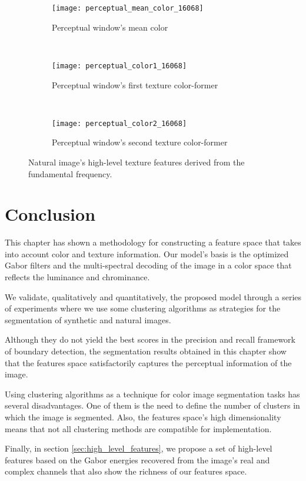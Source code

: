 \begin{figure}[!ht]
    \centering
    \begin{subfigure}[b]{0.7\textwidth}
    	\texttt{[image: perceptual\_mean\_color\_16068]}
        \caption{Perceptual window's mean color}
        \label{fig:perceptual_mean_color_16068}
    \end{subfigure}\\
    \begin{subfigure}[b]{0.7\textwidth}
    	\texttt{[image: perceptual\_color1\_16068]}
        \caption{Perceptual window's first texture color-former}
        \label{fig:perceptual_color1_16068}
    \end{subfigure}\\
    \begin{subfigure}[b]{0.7\textwidth}
    	\texttt{[image: perceptual\_color2\_16068]}
        \caption{Perceptual window's second texture color-former}
        \label{fig:perceptual_color2_16068}
    \end{subfigure}    
                  
    \caption{Natural image's high-level texture features derived from the fundamental frequency.}\label{fig:colors_high_level_features_zebre}    
\end{figure}


\section{Conclusion}
This chapter has shown a methodology for constructing a feature space that takes into account color and texture information. Our model's basis is the optimized Gabor filters and the multi-spectral decoding of the image in a color space that reflects the luminance and chrominance.

We validate, qualitatively and quantitatively, the proposed model through a series of experiments where we use some clustering algorithms as strategies for the segmentation of synthetic and natural images.

Although they do not yield the best scores in the precision and recall framework of boundary detection, the segmentation results obtained in this chapter show that the features space satisfactorily captures the perceptual information of the image.

Using clustering algorithms as a technique for color image segmentation tasks has several disadvantages. One of them is the need to define the number of clusters in which the image is segmented. Also, the features space's high dimensionality means that not all clustering methods are compatible for implementation.

Finally, in section \ref{sec:high_level_features}, we propose a set of high-level features based on the Gabor energies recovered from the image's real and complex channels that also show the richness of our features space.

